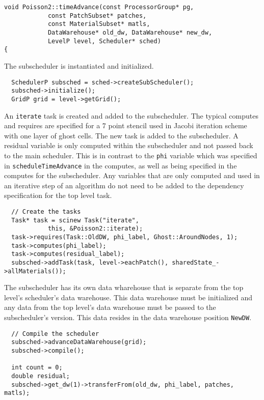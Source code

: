 \documentclass[12pt]{report}
\begin{document}
\begin{verbatim}
void Poisson2::timeAdvance(const ProcessorGroup* pg,
			const PatchSubset* patches,
			const MaterialSubset* matls,
			DataWarehouse* old_dw, DataWarehouse* new_dw,
			LevelP level, Scheduler* sched)
{

\end{verbatim}

The subscheduler is instantiated and initialized. 

\begin{verbatim}
  SchedulerP subsched = sched->createSubScheduler();
  subsched->initialize();
  GridP grid = level->getGrid();
\end{verbatim}

An \texttt{iterate} task is created and added to the subscheduler.
The typical computes and requires are specified for a 7 point stencil
used in Jacobi iteration scheme with one layer of ghost cells.  The
new task is added to the subscheduler.  A residual variable is only
computed within the subscheduler and not passed back to the main
scheduler.  This is in contrast to the \texttt{phi} variable which was
specified in \texttt{scheduleTimeAdvance} in the computes, as well as
being specified in the computes for the subscheduler.  Any variables
that are only computed and used in an iterative step of an algorithm
do not need to be added to the dependency specification for the top
level task.

\begin{verbatim}
  // Create the tasks
  Task* task = scinew Task("iterate",
			this, &Poisson2::iterate);
  task->requires(Task::OldDW, phi_label, Ghost::AroundNodes, 1);
  task->computes(phi_label);
  task->computes(residual_label);
  subsched->addTask(task, level->eachPatch(), sharedState_->allMaterials());
\end{verbatim}

The subscheduler has its own data wharehouse that is separate from the
top level's scheduler's data warehouse.  This data warehouse must be
initialized and any data from the top level's data warehouse must be
passed to the subscheduler's version.  This data resides in the data
warehouse position \texttt{NewDW}.

\begin{verbatim}
  // Compile the scheduler
  subsched->advanceDataWarehouse(grid);
  subsched->compile();

  int count = 0;
  double residual;
  subsched->get_dw(1)->transferFrom(old_dw, phi_label, patches, matls);
\end{verbatim}
\end{document}
